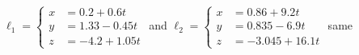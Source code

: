 {$\ell_1 = \left\{\begin{aligned} x&= 0.2+0.6t\\ y&= 1.33-0.45t\\ z&= -4.2+1.05t\end{aligned}\right.$ and 
$\ell_2 = \left\{\begin{aligned} x&= 0.86+9.2t\\ y&= 0.835-6.9t\\ z&= -3.045+16.1t\end{aligned}\right.$
}
{same
}

